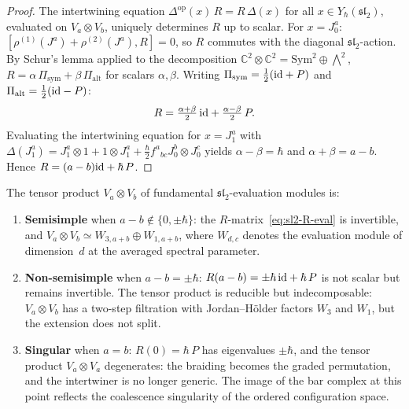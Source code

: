 \begin{proof}
The intertwining equation
$\Delta^{\mathrm{op}}(x)\,R=R\,\Delta(x)$ for all
$x\in Y_\hbar(\mathfrak{sl}_2)$, evaluated on
$V_a\otimes V_b$, uniquely determines $R$ up to scalar.
For $x=J^a_0$:
$[\rho^{(1)}(J^a)+\rho^{(2)}(J^a),R]=0$, so $R$
commutes with the diagonal $\mathfrak{sl}_2$-action. By
Schur's lemma applied to the decomposition
$\mathbb{C}^2\otimes\mathbb{C}^2=\mathrm{Sym}^2\oplus\bigwedge^2$,
$R=\alpha\,\Pi_{\mathrm{sym}}+\beta\,\Pi_{\mathrm{alt}}$
for scalars $\alpha,\beta$. Writing
$\Pi_{\mathrm{sym}}=\tfrac{1}{2}(\mathrm{id}+P)$ and
$\Pi_{\mathrm{alt}}=\tfrac{1}{2}(\mathrm{id}-P)$:
\[
R=\tfrac{\alpha+\beta}{2}\,\mathrm{id}
+\tfrac{\alpha-\beta}{2}\,P.
\]
Evaluating the intertwining equation for
$x=J^a_1$ with $\Delta(J^a_1)=J^a_1\otimes 1+1\otimes J^a_1
+\tfrac{\hbar}{2}f^a{}_{bc}J^b_0\otimes J^c_0$
yields $\alpha-\beta=\hbar$ and $\alpha+\beta=a-b$.
Hence $R=(a-b)\mathrm{id}+\hbar\,P$.
\end{proof}

\begin{corollary}
\label{cor:sl2-clebsch-gordan}
The tensor product $V_a\otimes V_b$ of fundamental
$\mathfrak{sl}_2$-evaluation modules is:
\begin{enumerate}[label=(\alph*)]
\item \textbf{Semisimple} when $a-b\notin\{0,\pm\hbar\}$:
the $R$-matrix~\eqref{eq:sl2-R-eval} is invertible, and
$V_a\otimes V_b\simeq W_{3,a+b}\oplus W_{1,a+b}$,
where $W_{d,c}$ denotes the evaluation module of dimension~$d$
at the averaged spectral parameter.

\item \textbf{Non-semisimple} when $a-b=\pm\hbar$:
$R(a-b)=\pm\hbar\,\mathrm{id}+\hbar\,P$ is not scalar but remains
invertible. The tensor product is reducible but
indecomposable: $V_a\otimes V_b$ has a two-step filtration
with Jordan--H\"older factors $W_3$ and $W_1$, but the
extension does not split.

\item \textbf{Singular} when $a=b$: $R(0)=\hbar\,P$
has eigenvalues $\pm\hbar$, and the tensor product $V_a\otimes V_a$
degenerates: the braiding becomes the graded
permutation, and the intertwiner is no longer generic.
The image of the bar complex at this point reflects the
coalescence singularity of the ordered configuration space.
\end{enumerate}
\end{corollary}

